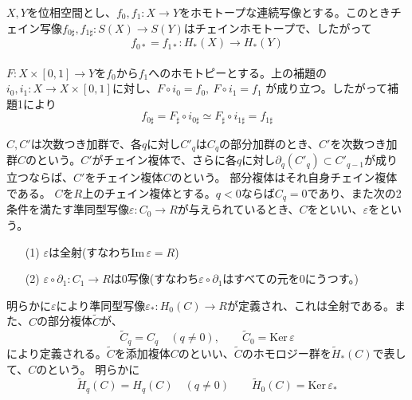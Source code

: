 \documentclass[dvipdfmx,a4paper,11pt]{jsarticle}
\begin{document}
\begin{tcolorbox}[title = 定理1,upperbox = visible]
  $X,Y$を位相空間とし、$f_{0},f_{1}:X\to Y$をホモトープな連続写像とする。このときチェイン写像$f_{0\sharp},f_{1\sharp}:S(X)\to S(Y)$はチェインホモトープで、したがって
  \begin{equation*}
    f_{0*}=f_{1*}:H_{*}(X)\to H_{*}(Y)
  \end{equation*}
  \tcblower
  \\
  $F:X\times [0,1]\to Y$を$f_{0}$から$f_{1}$へのホモトピーとする。上の補題の
  $i_{0},i_{1}:X\to X\times [0,1]$に対し、$F\circ i_{0}=f_{0},\ F\circ i_{1}=f_{1}$
  が成り立つ。したがって補題1により
  \begin{equation*}
    f_{0\sharp}=F_{\sharp}\circ i_{0\sharp}\simeq F_{\sharp}\circ i_{1\sharp}=f_{1\sharp}
  \end{equation*}
\end{tcolorbox}
$C,C'$は次数つき加群で、各$q$に対し$C'_{q}$は$C_{q}$の部分加群のとき、$C'$を次数つき加群$C$のという。$C'$がチェイン複体で、さらに各$q$に対し$\partial_{q}(C'_{q})\subset C'_{q-1}$が成り立つならば、$C'$をチェイン複体$C$のという。
部分複体はそれ自身チェイン複体である。
$C$を$R$上のチェイン複体とする。$q<0$ならば$C_{q}=0$であり、また次の2条件を満たす準同型写像$\varepsilon : C_{0}\to R$が与えられているとき、$C$をといい、$\varepsilon$をという。
\begin{itemize}
  \item[(1)] $\varepsilon$は全射(すなわち$\mathrm{Im}\, \varepsilon = R$)
  \item[(2)] $\varepsilon \circ \partial_{1} : C_{1}\to R$は$0$写像(すなわち$\varepsilon \circ \partial_{1}$はすべての元を$0$にうつす。)
\end{itemize}
明らかに$\varepsilon$により準同型写像$\varepsilon_{*} : H_{0}(C)\to R$が定義され、これは全射である。また、$C$の部分複体$\widetilde{C}$が、
\begin{equation*}
  \widetilde{C}_{q}=C_{q}\quad (q\neq 0),\qquad \widetilde{C}_{0}=\mathrm{Ker}\, \varepsilon
\end{equation*}
により定義される。$\widetilde{C}$を添加複体$C$のといい、$\widetilde{C}$のホモロジー群を$\widetilde{H}_{*}(C)$で表して、$C$のという。
明らかに
\begin{equation*}
  \widetilde{H}_{q}(C)=H_{q}(C)\quad (q\neq 0)\qquad \widetilde{H}_{0}(C)=\mathrm{Ker}\, \varepsilon_{*}
\end{equation*}
\end{document}
